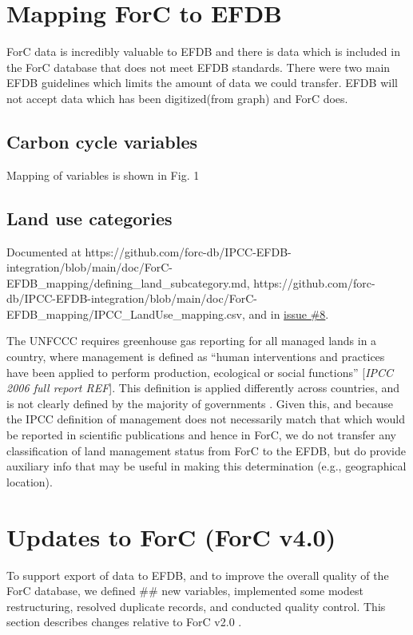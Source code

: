 \documentclass[, manuscript]{copernicus}
\begin{document}
\section{Mapping ForC to EFDB}

ForC data is incredibly valuable to EFDB and there is data which is
included in the ForC database that does not meet EFDB standards. There
were two main EFDB guidelines which limits the amount of data we could
transfer. EFDB will not accept data which has been digitized(from graph)
and ForC does.

\subsection{Carbon cycle variables}

Mapping of variables is shown in Fig. 1

\subsection{Land use categories}

Documented at
https://github.com/forc-db/IPCC-EFDB-integration/blob/main/doc/ForC-EFDB\_mapping/defining\_land\_subcategory.md,
https://github.com/forc-db/IPCC-EFDB-integration/blob/main/doc/ForC-EFDB\_mapping/IPCC\_LandUse\_mapping.csv,
and in
\href{https://github.com/forc-db/IPCC_database_integration/issues/8}{issue
\#8}.

The UNFCCC requires greenhouse gas reporting for all managed lands in a
country, where management is defined as ``human interventions and
practices have been applied to perform production, ecological or social
functions'' {[}\emph{IPCC 2006 full report REF}{]}. This definition is
applied differently across countries, and is not clearly defined by the
majority of governments \citep{ogle_delineating_2018}. Given this, and
because the IPCC definition of management does not necessarily match
that which would be reported in scientific publications and hence in
ForC, we do not transfer any classification of land management status
from ForC to the EFDB, but do provide auxiliary info that may be useful
in making this determination (e.g., geographical location).

\section{Updates to ForC (ForC v4.0)}

To support export of data to EFDB, and to improve the overall quality of
the ForC database, we defined \#\# new variables, implemented some
modest restructuring, resolved duplicate records, and conducted quality
control. This section describes changes relative to ForC v2.0
\citep{anderson-teixeira_forc_2018}.
\end{document}
